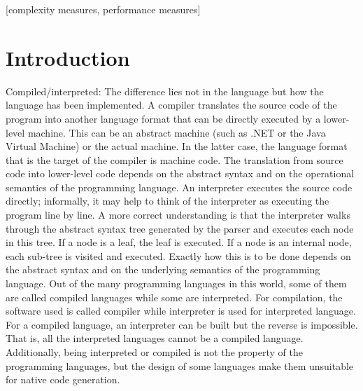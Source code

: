 \documentclass{sig-alternate}
\begin{document}
\maketitle
\begin{abstract}

\end{abstract}

[complexity measures, performance measures]



\section{Introduction}
Compiled/interpreted: The difference lies not in the language but how the language has been implemented. A compiler translates the source code of the program into another language format that can be directly executed by a lower-level machine. This can be an abstract machine (such as .NET or the Java Virtual Machine) or the actual machine. In the latter case, the language format that is the target of the compiler is machine code. The translation from source code into lower-level code depends on the abstract syntax and on the operational semantics of the programming language. An interpreter executes the source code directly; informally, it may help to think of the interpreter as executing the program line by line. A more correct understanding is that the interpreter walks through the abstract syntax tree generated by the parser and executes each node in this tree. If a node is a leaf, the leaf is executed. If a node is an internal node, each sub-tree is visited and executed. Exactly how this is to be done depends on the abstract syntax and on the underlying semantics of the programming language.
Out of the many programming languages in this world, some of them are called compiled languages while some are interpreted. For compilation, the software used is called compiler while interpreter is used for interpreted language. For a compiled language, an interpreter can be built but the reverse is impossible. That is, all the interpreted languages cannot be a compiled language. Additionally, being interpreted or compiled is not the property of the programming languages, but the design of some languages make them unsuitable for native code generation.
\end{document}
